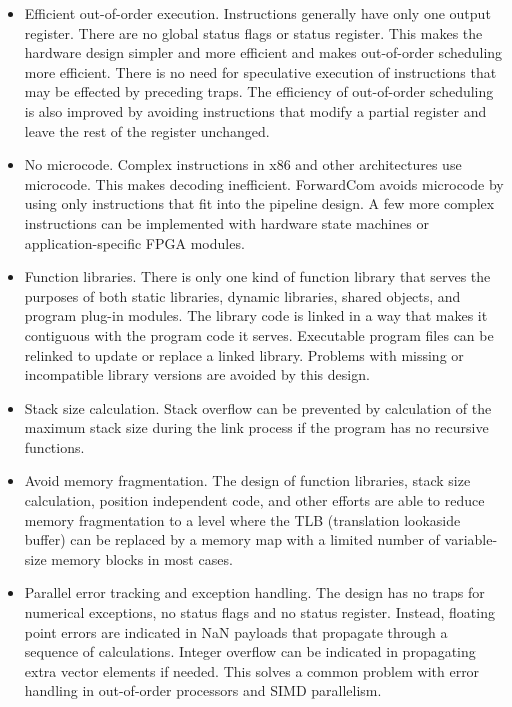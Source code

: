 \documentclass[forwardcom.tex]{subfiles}
\begin{document}
\begin{itemize}
\item Efficient out-of-order execution. Instructions generally have only one output register. There are no global status flags or status register. This makes the hardware design simpler and more efficient and makes out-of-order scheduling more efficient. There is no need for speculative execution of instructions that may be effected by preceding traps. The efficiency of out-of-order scheduling is also improved by avoiding instructions that modify a partial register and leave the rest of the register unchanged.

\item No microcode. Complex instructions in x86 and other architectures use microcode. This makes decoding inefficient. ForwardCom avoids microcode by using only instructions that fit into the pipeline design. A few more complex instructions can be implemented with hardware state machines or application-specific FPGA modules.

\item Function libraries. There is only one kind of function library that serves the purposes of both static libraries, dynamic libraries, shared objects, and program plug-in modules. The library code is linked in a way that makes it contiguous with the program code it serves. Executable program files can be relinked to update or replace a linked library. Problems with missing or incompatible library versions are avoided by this design.

\item Stack size calculation. Stack overflow can be prevented by calculation of the maximum stack size during the link process if the program has no recursive functions.

\item Avoid memory fragmentation. The design of function libraries, stack size calculation, position independent code, and other efforts are able to reduce memory fragmentation to a level where the TLB (translation lookaside buffer) can be replaced by a memory map with a limited number of variable-size memory blocks in most cases.

\item Parallel error tracking and exception handling. The design has no traps for numerical exceptions, no status flags and no status register. Instead, floating point errors are indicated in NaN payloads that propagate through a sequence of calculations. Integer overflow can be indicated in propagating extra vector elements if needed. This solves a common problem with error handling in out-of-order processors and SIMD parallelism.


\end{itemize}
\end{document}

